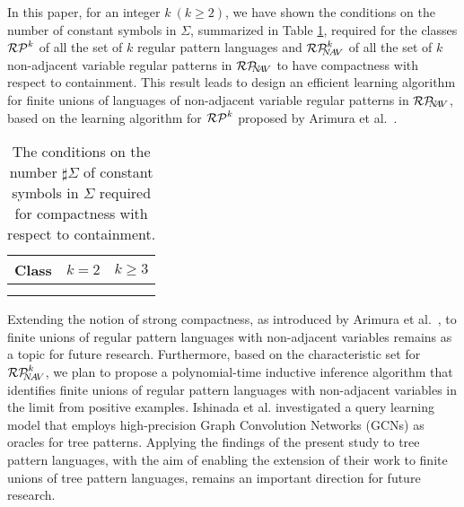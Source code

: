 
In this paper, for an integer $k~(k\ge 2)$, we have shown the conditions on the number of constant symbols in $\Sigma$, summarized in Table \ref{table:results}, required for the classes $\RPatkei$ of all the set of $k$ regular pattern languages and $\NAVRPkei$ of all the set of $k$ non-adjacent variable regular patterns in $\mathcal{RP}_{\!\!\!N\!\!A\!V}$ to have compactness with respect to containment.
This result leads to design an efficient learning algorithm for finite unions of languages of non-adjacent variable regular patterns in $\mathcal{RP}_{\!\!\!N\!\!A\!V}$, based on the learning algorithm for $\RPatkei$ proposed by Arimura et al.~\cite{Arimura1994}.
\begin{table}
\caption{The conditions on the number $\sharp \Sigma$ of constant symbols in $\Sigma$ required for compactness with respect to containment.}\label{table:results}
\begin{center}
\begin{tabular}{c|c|c}
  Class & $k=2$ & $k\ge 3$\\
  \hline
  \raisebox{-5pt}{$\RPatkei$} & \raisebox{-5pt}{$\sharp \Sigma \ge 4$} & \raisebox{-5pt}{$\sharp \Sigma \ge 2k-1$} \\[10pt]
  \hline
  \raisebox{-5pt}{$\NAVRPkei$} & \multicolumn{2}{c}{\raisebox{-5pt}{$\sharp \Sigma \ge k+2$}}\\[10pt]
\end{tabular}
\end{center}
\vspace*{-10pt}
\end{table}

Extending the notion of strong compactness, as introduced by Arimura et al.~\cite{Arimura1996}, to finite unions of regular pattern languages with non-adjacent variables remains as a topic for future research.
Furthermore, based on the characteristic set for $\NAVRPkei$, we plan to propose a polynomial-time inductive inference algorithm that identifies finite unions of regular pattern languages with non-adjacent variables in the limit from positive examples.
Ishinada et al. \cite{Ishinada2023} investigated a query learning model that employs high-precision Graph Convolution Networks (GCNs) as oracles for tree patterns.
Applying the findings of the present study to tree pattern languages, with the aim of enabling the extension of their work to finite unions of tree pattern languages, remains an important direction for future research.